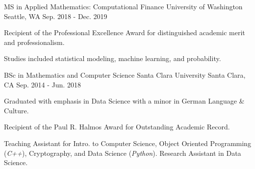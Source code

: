 
\begin{cventries}

  \cventry
    {MS in Applied Mathematics: Computational Finance} %
    {University of Washington} %
    {Seattle, WA} %
    {Sep. 2018 - Dec. 2019} %
    {
      \begin{cvitems} %
        \item {Recipient of the Professional Excellence Award for distinguished academic merit and professionalism.}
        \item {Studies included statistical modeling, machine learning, and probability.}
      \end{cvitems}
    }

  \cventry
    {BSc in Mathematics and Computer Science} %
    {Santa Clara University} %
    {Santa Clara, CA} %
    {Sep. 2014 - Jun. 2018} %
    {
      \begin{cvitems} %
        \item {Graduated with emphasis in Data Science with a minor in German Language \& Culture.}
        \item {Recipient of the Paul R. Halmos Award for Outstanding Academic Record.}
        \item {Teaching Assistant for Intro. to Computer Science, Object Oriented Programming (\small\textit{C++}), Cryptography, and Data Science (\small\textit{Python}). Research Assistant in Data Science.}
      \end{cvitems}
    }

\end{cventries}
